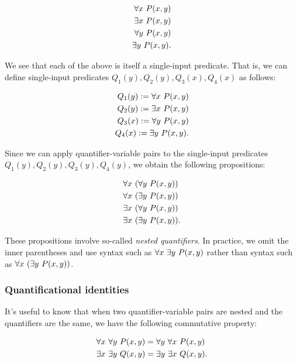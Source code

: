 \begin{align*}
    \forall x \text{ } P(x, y) \\
    \exists x \text{ } P(x, y) \\
    \forall y \text{ } P(x, y) \\
    \exists y \text{ } P(x, y).
\end{align*}

We see that each of the above is itself a single-input predicate. That is, we can define single-input predicates $Q_1(y), Q_2(y), Q_3(x), Q_4(x)$ as follows:

\begin{align*}
    Q_1(y) := \forall x \text{ } P(x, y) \\
    Q_2(y) := \exists x \text{ } P(x, y) \\
    Q_3(x) := \forall y \text{ } P(x, y) \\
    Q_4(x) := \exists y \text{ } P(x, y).
\end{align*}

Since we can apply quantifier-variable pairs to the single-input predicates $Q_1(y), Q_2(y), Q_3(y), Q_4(y)$, we obtain the following propositions:

\begin{align*}
    &\forall x \text{ } (\forall y \text{ } P(x, y)) \\
    &\forall x \text{ } (\exists y \text{ } P(x, y)) \\
    &\exists x \text{ } (\forall y \text{ } P(x, y)) \\
    &\exists x \text{ } (\exists y \text{ } P(x, y)).
\end{align*}

These propositions involve so-called \textit{nested quantifiers}. In practice, we omit the inner parentheses and use syntax such as $\forall x \text{ } \exists y \text{ } P(x, y)$ rather than syntax such as $\forall x \text{ } (\exists y \text{ } P(x, y))$.

\subsubsection*{Quantificational identities}

It's useful to know that when two quantifier-variable pairs are nested and the quantifiers are the same, we have the following commutative property:

\begin{align*}
    &\forall x \text{ } \forall y \text{ } P(x, y) = \forall y \text{ } \forall x \text{ } P(x, y) \\
    &\exists x \text{ } \exists y \text{ } Q(x, y) = \exists y \text{ } \exists x \text{ } Q(x, y).
\end{align*}

